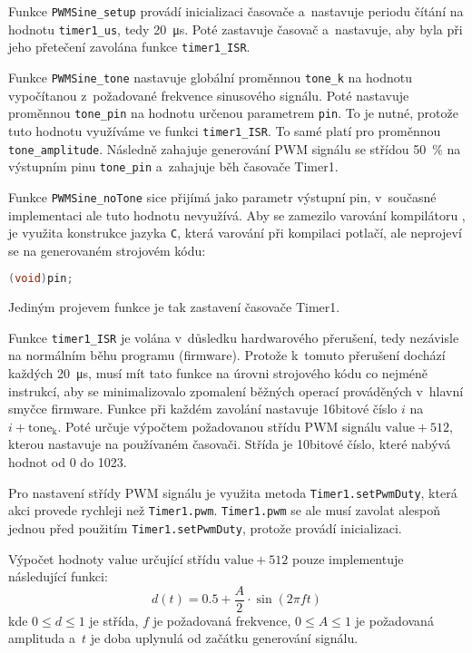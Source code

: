 Funkce \verb|PWMSine_setup| provádí inicializaci časovače a~nastavuje periodu
čítání na hodnotu \verb|timer1_us|, tedy \SI{20}{\micro\second}. Poté
zastavuje časovač a~nastavuje, aby byla při jeho přetečení zavolána funkce
\verb|timer1_ISR|.

Funkce \verb|PWMSine_tone| nastavuje globální proměnnou \verb|tone_k| na
hodnotu vypočítanou z~požadované frekvence sinusového signálu.
Poté nastavuje proměnnou \verb|tone_pin| na hodnotu určenou parametrem
\texttt{pin}. To je nutné, protože tuto hodnotu využíváme ve funkci
\verb|timer1_ISR|. To samé platí pro proměnnou \verb|tone_amplitude|.
Následně zahajuje generování PWM signálu se střídou \SI{50}{\percent} na
výstupním pinu \verb|tone_pin| a~zahajuje běh časovače Timer1.

Funkce \verb|PWMSine_noTone| sice přijímá jako parametr výstupní pin,
v~současné implementaci ale tuto hodnotu nevyužívá. Aby se zamezilo varování
kompilátoru  ,
je využita konstrukce jazyka \texttt{C}, která varování při kompilaci potlačí,
ale neprojeví se na generovaném strojovém kódu:
\begin{lstlisting}[language=C]
(void)pin;
\end{lstlisting}
Jediným projevem funkce je tak zastavení časovače Timer1.

Funkce \verb|timer1_ISR| je volána v~důsledku hardwarového přerušení,
tedy nezávisle na normálním běhu programu (firmware). Protože k~tomuto
přerušení dochází každých \SI{20}{\micro\second}, musí mít tato funkce na
úrovni strojového kódu co nejméně instrukcí, aby se minimalizovalo zpomalení
běžných operací prováděných v~hlavní smyčce firmware. Funkce při každém
zavolání nastavuje 16bitové číslo $i$ na $i + \mathrm{tone_k}$. Poté určuje
výpočtem požadovanou střídu PWM signálu $\mathrm{value}+512$, kterou nastavuje
na používaném časovači. Střída je 10bitové číslo, které nabývá hodnot
od \num{0} do \num{1023}.

Pro nastavení střídy PWM signálu je využita metoda \texttt{Timer1.setPwmDuty},
která akci provede rychleji než \texttt{Timer1.pwm}. \texttt{Timer1.pwm} se ale
musí zavolat alespoň jednou před použitím \texttt{Timer1.setPwmDuty}, protože
provádí inicializaci.~\cite[ověřeno praktickým pokusem]{TimerOnedocs}

Výpočet hodnoty $\mathrm{value}$ určující střídu $\mathrm{value}+512$ pouze
implementuje následující funkci:
\begin{equation}
    d(t) = \num{0,5} + \frac{A}{2} \cdot \sin{(2\pi f t)}
    \label{eq:duty float}
\end{equation}
kde $0 \le d \le 1$ je střída, $f$ je požadovaná frekvence, $0 \le A \le 1$ je
požadovaná amplituda a~$t$ je doba uplynulá od začátku generování signálu.

